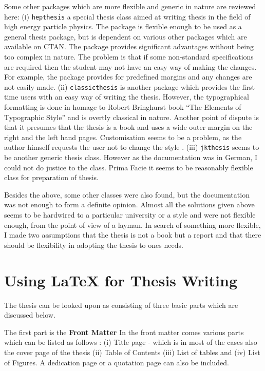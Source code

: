 \documentclass{pracjourn}
\begin{document}
Some other packages which are more flexible and generic in nature are  reviewed
here:  (i) \texttt{hepthesis} \cite{ABUCKLEY} a special thesis class aimed at
writing thesis in the field of high energy particle physics. The package is
flexible enough to be used as a general thesis package, but is dependent on
various other packages which are available on CTAN. The package provides
significant advantages without being too complex in nature. The problem is that
if some non-standard specifications are required then the student may not have
an easy way of making the changes. For example, the package provides for
predefined margins and any changes are not easily made. (ii)
\texttt{classicthesis} \cite{AMIEDE} is another package which provides the
first time users with an easy way of writing the thesis. However, the
typographical formatting is done in homage to Robert Bringhurst book ``The
Elements of Typographic Style'' and is overtly classical in nature. Another
point of dispute is that it presumes that the thesis is a book and uses a wide
outer margin on the right and the left hand pages. Customisation seems to be a
problem, as the author himself requests the user not to change the style
\cite[pp. 2]{AMIEDE}. (iii) \texttt{jkthesis} \cite{JKUPPER} seems to be
another generic thesis class. However as the documentation was in German, I
could not do justice to the class. Prima Facie it seems to be reasonably
flexible class for preparation of thesis.

Besides the above, some other classes were also found, but the documentation
was not  enough to form a definite opinion. Almost all the solutions given
above seems to be hardwired to a particular university or a style and were not
flexible enough, from the point of view of a layman. In search of something
more flexible, I made two  assumptions that the thesis is not a book but a
report and that there should be flexibility in adopting the thesis to ones
needs.

\section{Using \LaTeX{} for Thesis Writing}

The thesis can be looked upon as consisting of three basic parts which are
discussed below.

The first part is the \textbf{Front Matter} In the front matter comes various
parts which can be listed as follows : (i) Title page - which is in most of the
cases also the cover page of the thesis (ii) Table of Contents (iii) List of
tables and (iv) List of Figures. A dedication page or a quotation page can also
be included.
\end{document}
